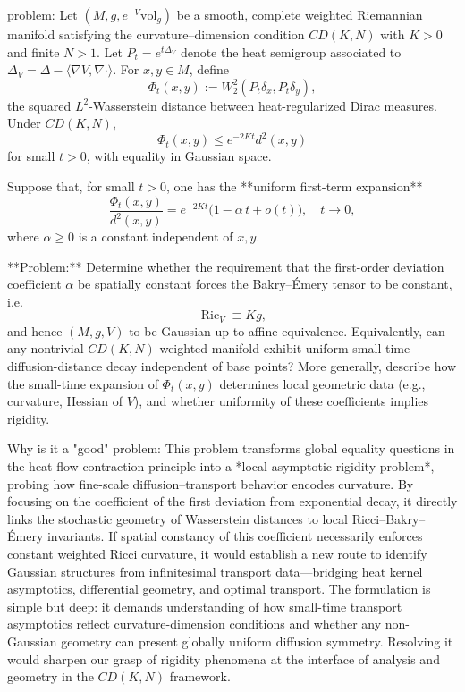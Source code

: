 problem:  
Let \((M,g,e^{-V}\mathrm{vol}_g)\) be a smooth, complete weighted Riemannian manifold satisfying the curvature–dimension condition \(CD(K,N)\) with \(K>0\) and finite \(N>1\).  
Let \(P_t = e^{t\Delta_V}\) denote the heat semigroup associated to \(\Delta_V = \Delta - \langle\nabla V,\nabla \cdot\rangle\).  
For \(x,y\in M\), define  
\[
\Phi_t(x,y) := W_2^2(P_t\delta_x,P_t\delta_y),
\]
the squared \(L^2\)-Wasserstein distance between heat-regularized Dirac measures. Under \(CD(K,N)\),
\[
\Phi_t(x,y)\le e^{-2Kt}d^2(x,y)
\]
for small \(t>0\), with equality in Gaussian space.

Suppose that, for small \(t>0\), one has the **uniform first-term expansion**
\[
\frac{\Phi_t(x,y)}{d^2(x,y)} = e^{-2Kt}\bigl(1-\alpha\,t + o(t)\bigr),\quad t\to0,
\]
where \(\alpha\ge0\) is a constant independent of \(x,y\).  

**Problem:**  
Determine whether the requirement that the first-order deviation coefficient \(\alpha\) be spatially constant forces the Bakry–Émery tensor to be constant, i.e.
\[
\operatorname{Ric}_V \equiv K g,
\]
and hence \((M,g,V)\) to be Gaussian up to affine equivalence.  
Equivalently, can any nontrivial \(CD(K,N)\) weighted manifold exhibit uniform small-time diffusion-distance decay independent of base points?  
More generally, describe how the small-time expansion of \(\Phi_t(x,y)\) determines local geometric data (e.g., curvature, Hessian of \(V\)), and whether uniformity of these coefficients implies rigidity.

Why is it a "good" problem:  
This problem transforms global equality questions in the heat-flow contraction principle into a *local asymptotic rigidity problem*, probing how fine-scale diffusion–transport behavior encodes curvature. By focusing on the coefficient of the first deviation from exponential decay, it directly links the stochastic geometry of Wasserstein distances to local Ricci–Bakry–Émery invariants.  
If spatial constancy of this coefficient necessarily enforces constant weighted Ricci curvature, it would establish a new route to identify Gaussian structures from infinitesimal transport data—bridging heat kernel asymptotics, differential geometry, and optimal transport.  
The formulation is simple but deep: it demands understanding of how small-time transport asymptotics reflect curvature-dimension conditions and whether any non-Gaussian geometry can present globally uniform diffusion symmetry. Resolving it would sharpen our grasp of rigidity phenomena at the interface of analysis and geometry in the \(CD(K,N)\) framework.